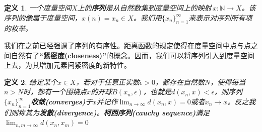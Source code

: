 \documentclass[mathserif,hyperref,UTF8,openany,b5paper]{ctexbook}
\newtheorem{defn}{定义}[section]
\begin{document}
\begin{defn}
一个度量空间$X$上的\textbf{序列}是从自然数集到度量空间上的映射$\, x:\mathbb{N}\xrightarrow{}X$。该序列的像属于度量空间，$x(n)=x_n \in X$。我们用$\{x_n\}_{n=1}^\infty$来表示对序列所有项的枚举。
\end{defn}

我们在之前已经强调了序列的有序性。距离函数的规定使得在度量空间中点与点之间自然有了\textbf{“紧密度(closeness)”}的概念。因而，我们可以将序列引入到度量空间上去，为其增加元素间紧密度的新特性。

\begin{defn}
给定某个$x\in X$，若对于任意正实数$\epsilon > 0$，都存在自然数$N$，使得每当$n>N$时，都有一个围绕点$x$的开球$B(x_n,\epsilon)$，也就是$d(x_n,x)<\epsilon$，则序列$\{x_n\}_{n=1}^\infty$\textbf{收敛(converges)}于$x$并记作$\lim_{n\xrightarrow{}\infty} d(x_n,x)=0$或者$x_n \xrightarrow{} x$。反之我们则称其为\textbf{发散(divergence)}。\textbf{柯西序列(cauchy sequence)}满足$\lim_{n,m\xrightarrow{}\infty} d(x_n,x_m)=0$
\end{defn}
\end{document}
